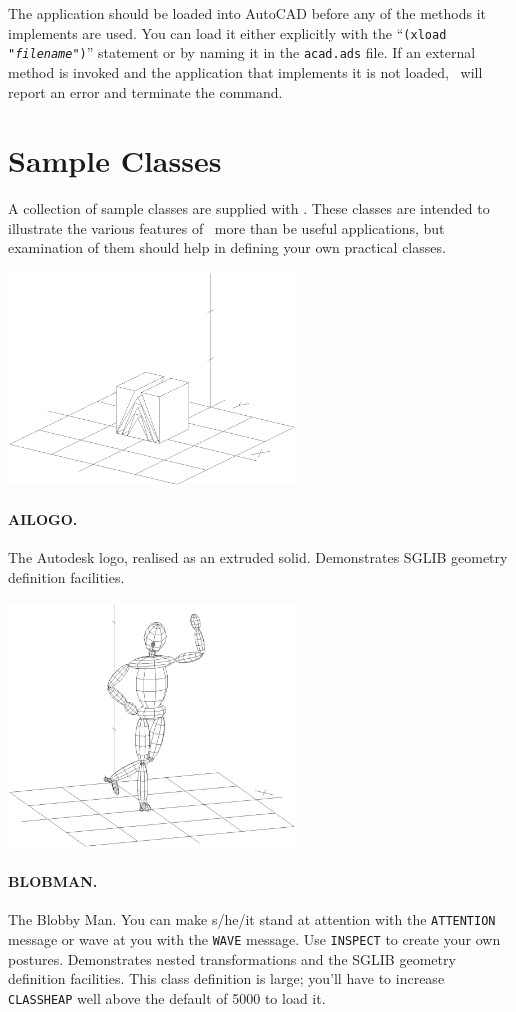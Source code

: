\documentclass{article}
\begin{document}
The application should be loaded into AutoCAD before any of the
methods it implements are used.  You can load it either explicitly with
the ``{\tt (xload "{\em filename}")}'' statement or by naming it in
the {\tt acad.ads} file.  If an external method is invoked and the
application that implements it is not loaded, \cw\ will report an
error and terminate the command.

\section{Sample Classes}

A collection of sample classes are supplied with \cw .  These classes
are intended to illustrate the various features of \cw\ more than be
useful applications, but examination of them should help in defining
your own practical classes.

\centerline{\includegraphics[width=3in]{cwfig2.eps}}
\paragraph{AILOGO.}  The Autodesk logo, realised as an extruded solid.
                Demonstrates SGLIB geometry definition facilities.

\centerline{\includegraphics[width=3in]{cwfig3.eps}}
\paragraph{BLOBMAN.}  The Blobby Man.  You can make s/he/it stand at
                attention with the {\tt ATTENTION} message or wave at
                you with the {\tt WAVE} message.  Use {\tt INSPECT} to
                create your own postures.  Demonstrates nested
                transformations and the SGLIB geometry
                definition facilities.  This class definition is
                large; you'll have to increase {\tt CLASSHEAP} well
                above the default of 5000 to load it.
\end{document}
